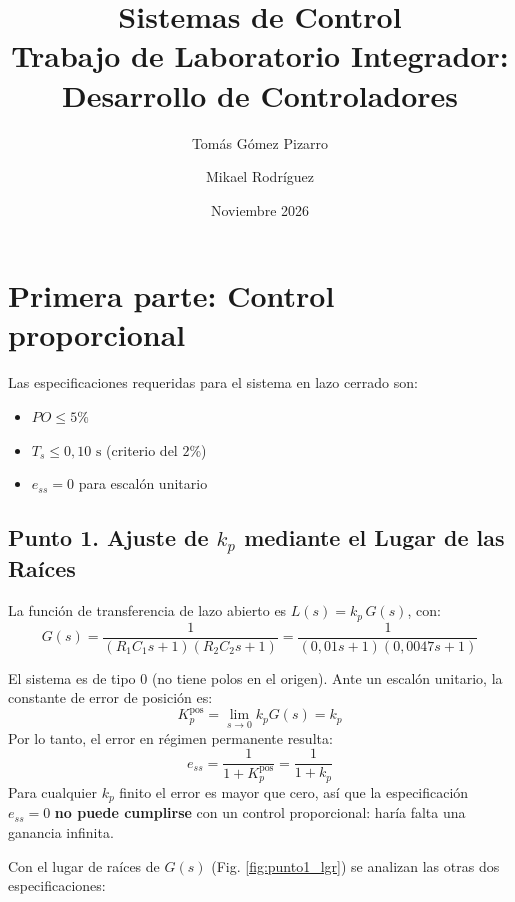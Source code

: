 \documentclass[11pt,a4paper]{article}
\title{
    \vspace{-1.2cm}
    \textbf{Sistemas de Control}\\
    \large Trabajo de Laboratorio Integrador: Desarrollo de Controladores
}
\author{Tomás Gómez Pizarro \quad\and\quad Mikael Rodríguez}
\date{Noviembre 2026}
\begin{document}
\maketitle

\section*{Primera parte: Control proporcional}

Las especificaciones requeridas para el sistema en lazo cerrado son:
\begin{itemize}
    \item $PO \le 5\%$
    \item $T_s \le 0{,}10\text{ s}$ (criterio del $2\%$)
    \item $e_{ss} = 0$ para escalón unitario
\end{itemize}

\subsection*{Punto 1. Ajuste de $k_p$ mediante el Lugar de las Raíces}

La función de transferencia de lazo abierto es $L(s) = k_p\, G(s)$, con:
\begin{equation}
    G(s) = \frac{1}{(R_1 C_1 s + 1)(R_2 C_2 s + 1)} = \frac{1}{(0{,}01s + 1)(0{,}0047s + 1)}
\end{equation}

El sistema es de tipo 0 (no tiene polos en el origen). Ante un escalón unitario, la constante de error de posición es:
\begin{equation}
    K_p^{\text{pos}} = \lim_{s \to 0} k_p G(s) = k_p
\end{equation}
Por lo tanto, el error en régimen permanente resulta:
\begin{equation}
    e_{ss} = \frac{1}{1 + K_p^{\text{pos}}} = \frac{1}{1 + k_p}
\end{equation}
Para cualquier $k_p$ finito el error es mayor que cero, así que la especificación $e_{ss} = 0$ \textbf{no puede cumplirse} con un control proporcional: haría falta una ganancia infinita.

Con el lugar de raíces de $G(s)$ (Fig. \ref{fig:punto1_lgr}) se analizan las otras dos especificaciones:
\end{document}
